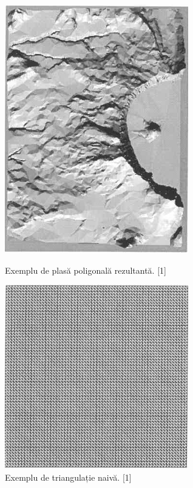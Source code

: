 \documentclass[12pt]{article}
\begin{document}
\begin{figure}[!htb]
	\begin{minipage}{0.32\textwidth}
		\centering
		\includegraphics[width=.7\linewidth]{ExempluPlasa.png}
		\caption{Exemplu de plasă poligonală rezultantă. [1]}\label{fig:fig1}
	\end{minipage}\hfill
	\begin{minipage}{0.32\textwidth}
		\centering
		\includegraphics[width=.7\linewidth]{ExempluTriangulatieNaiva.png}
		\caption{Exemplu de triangulație naivă. [1]}\label{fig:fig2}
	\end{minipage}\hfill

\end{figure}
\end{document}
